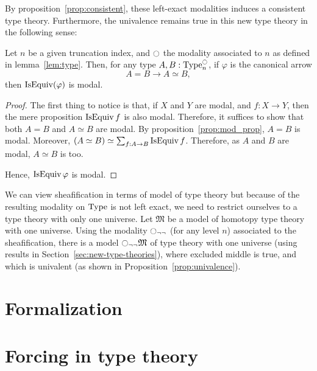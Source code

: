 By proposition~\ref{prop:consistent}, these left-exact modalities
induces a consistent type theory. Furthermore, the univalence remains
true in this new type theory in the following sense:
\begin{prop}\label{prop:univalence}
  Let $n$ be a given truncation index, and $\ocircle$ the modality
  associated to $n$ as defined in lemma~\ref{lem:type}. Then, for
  any type $A,B:\operatorname{Type}_n^{\ocircle}$, if $\varphi$ is the canonical arrow
  $$A = B \to A\simeq B,$$
  then $\operatorname{IsEquiv}(\varphi)$ is modal.
\end{prop}
\begin{proof}
  The first thing to notice is that, if $X$ and $Y$ are modal, and
  $f:X \to Y$, then the mere proposition $\operatorname{IsEquiv} f$ is also modal.
  Therefore, it suffices to show that both $A=B$ and $A\simeq B$ are
  modal. By proposition~\ref{prop:mod_prop}, $A=B$ is modal. 
  Moreover, $(A\simeq B) \simeq \sum_{f:A\to B} \operatorname{IsEquiv}
  f$. Therefore, as $A$ and $B$ are modal, $A\simeq B$ is too. 

  Hence, $\operatorname{IsEquiv} \varphi$ is modal.
\end{proof}

We can view sheafification in terms of model of type theory but
because of the resulting modality on $\operatorname{Type}$ is not left exact, we
need to restrict ourselves to a type theory with only one universe.
%
Let $\mathfrak M$ be a model of homotopy type theory with one
universe.
%
Using the modality $\ocircle_{\lnot \lnot}$ (for any level $n$) associated to the
sheafification, there is a model $\ocircle_{\lnot \lnot} \mathfrak M$ of type theory
with one universe (using results in
Section~\ref{sec:new-type-theories}), where excluded middle is true, and
which is univalent (as shown in Proposition~\ref{prop:univalence}).
%

\section{Formalization}
\label{sec:sheaf-formalization}




\section{Forcing in type theory}
\label{sec:forcing}
